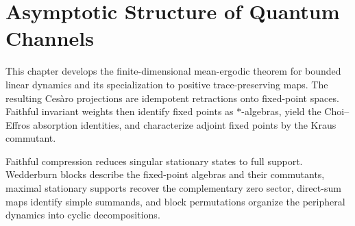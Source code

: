 \chapter{Asymptotic Structure of Quantum Channels}
\label{ch:channel_asymptotics}

This chapter develops the finite-dimensional mean-ergodic theorem for bounded
linear dynamics and its specialization to positive trace-preserving maps. The
resulting Ces\`aro projections are idempotent retractions onto fixed-point
spaces. Faithful invariant weights then identify fixed points as
$*$-algebras, yield the Choi--Effros absorption identities, and characterize
adjoint fixed points by the Kraus commutant.

Faithful compression reduces singular stationary states to full support.
Wedderburn blocks describe the fixed-point algebras and their commutants,
maximal stationary supports recover the complementary zero sector, direct-sum
maps identify simple summands, and block permutations organize the peripheral
dynamics into cyclic decompositions.





